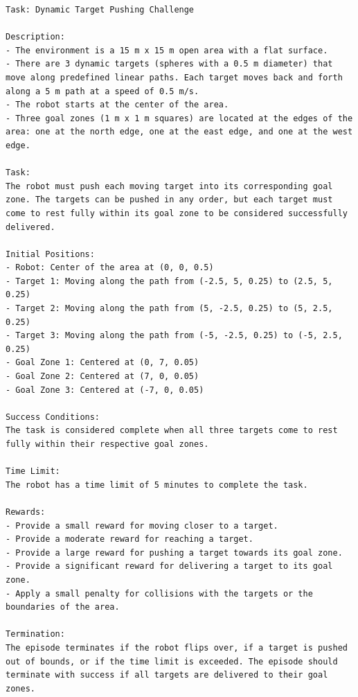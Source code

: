 \begin{lstlisting}[language={}]
Task: Dynamic Target Pushing Challenge

Description:
- The environment is a 15 m x 15 m open area with a flat surface.
- There are 3 dynamic targets (spheres with a 0.5 m diameter) that move along predefined linear paths. Each target moves back and forth along a 5 m path at a speed of 0.5 m/s.
- The robot starts at the center of the area.
- Three goal zones (1 m x 1 m squares) are located at the edges of the area: one at the north edge, one at the east edge, and one at the west edge.

Task:
The robot must push each moving target into its corresponding goal zone. The targets can be pushed in any order, but each target must come to rest fully within its goal zone to be considered successfully delivered.

Initial Positions:
- Robot: Center of the area at (0, 0, 0.5)
- Target 1: Moving along the path from (-2.5, 5, 0.25) to (2.5, 5, 0.25)
- Target 2: Moving along the path from (5, -2.5, 0.25) to (5, 2.5, 0.25)
- Target 3: Moving along the path from (-5, -2.5, 0.25) to (-5, 2.5, 0.25)
- Goal Zone 1: Centered at (0, 7, 0.05)
- Goal Zone 2: Centered at (7, 0, 0.05)
- Goal Zone 3: Centered at (-7, 0, 0.05)

Success Conditions:
The task is considered complete when all three targets come to rest fully within their respective goal zones.

Time Limit:
The robot has a time limit of 5 minutes to complete the task.

Rewards:
- Provide a small reward for moving closer to a target.
- Provide a moderate reward for reaching a target.
- Provide a large reward for pushing a target towards its goal zone.
- Provide a significant reward for delivering a target to its goal zone.
- Apply a small penalty for collisions with the targets or the boundaries of the area.

Termination:
The episode terminates if the robot flips over, if a target is pushed out of bounds, or if the time limit is exceeded. The episode should terminate with success if all targets are delivered to their goal zones.
\end{lstlisting}
